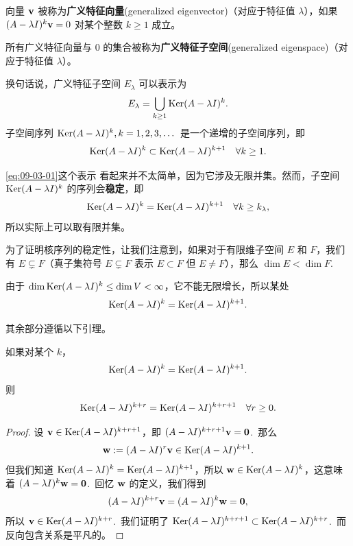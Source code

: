 \begin{definition}\label{stmt:09-03-02}
向量 $\mathbf{v}$ 被称为\textbf{广义特征向量}(generalized eigenvector)（对应于特征值 $\lambda$），如果 $(A - \lambda I)^k \mathbf{v} = 0$ 对某个整数 $k \geq 1$ 成立。
\end{definition}

所有广义特征向量与 $0$ 的集合被称为\textbf{广义特征子空间}(generalized eigenspace)（对应于特征值 $\lambda$）。

换句话说，广义特征子空间 $E_\lambda$ 可以表示为
\begin{equation}\label{eq:09-03-01}
E_\lambda = \bigcup_{k \geq 1} \operatorname{Ker}(A - \lambda I)^k.
\end{equation}
子空间序列 $\operatorname{Ker}(A - \lambda I)^k, k = 1, 2, 3, \dots$ 是一个递增的子空间序列，即
$$\operatorname{Ker}(A - \lambda I)^k \subset \operatorname{Ker}(A - \lambda I)^{k+1} \quad \forall k \geq 1.$$

\eqref{eq:09-03-01}这个表示  看起来并不太简单，因为它涉及无限并集。然而，子空间 $\operatorname{Ker}(A - \lambda I)^k$ 的序列会\textbf{稳定}，即
$$\operatorname{Ker}(A - \lambda I)^k = \operatorname{Ker}(A - \lambda I)^{k+1} \quad \forall k \geq k_\lambda,$$
所以实际上可以取有限并集。

为了证明核序列的稳定性，让我们注意到，如果对于有限维子空间 $E$ 和 $F$，我们有 $E \subsetneq F$（真子集符号 $E \subsetneq F$ 表示 $E \subset F$ 但 $E \neq F$），那么 $\dim E < \dim F$.~

由于 $\dim \operatorname{Ker}(A - \lambda I)^k \leq \dim V < \infty$，它不能无限增长，所以某处
$$\operatorname{Ker}(A - \lambda I)^k = \operatorname{Ker}(A - \lambda I)^{k+1}.$$

其余部分遵循以下引理。

\begin{lemma}\label{stmt:09-03-03}
如果对某个 $k$，
$$\operatorname{Ker}(A - \lambda I)^k = \operatorname{Ker}(A - \lambda I)^{k+1}.$$则
$$\operatorname{Ker}(A - \lambda I)^{k+r} = \operatorname{Ker}(A - \lambda I)^{k+r+1} \quad \forall r \geq 0.$$\end{lemma}

\begin{proof}设 $\mathbf{v} \in \operatorname{Ker}(A - \lambda I)^{k+r+1}$，即 $(A - \lambda I)^{k+r+1} \mathbf{v} = \mathbf{0}$.~那么 $$\mathbf{w} := (A - \lambda I)^r \mathbf{v} \in \operatorname{Ker}(A - \lambda I)^{k+1}.$$
但我们知道 $\operatorname{Ker}(A - \lambda I)^k = \operatorname{Ker}(A - \lambda I)^{k+1}$，所以 $\mathbf{w} \in \operatorname{Ker}(A - \lambda I)^k$，这意味着 $(A - \lambda I)^k \mathbf{w} = \mathbf{0}$.~回忆 $\mathbf{w}$ 的定义，我们得到
$$(A - \lambda I)^{k+r} \mathbf{v} = (A - \lambda I)^k \mathbf{w} = \mathbf{0},$$
所以 $\mathbf{v} \in \operatorname{Ker}(A - \lambda I)^{k+r}$.~我们证明了 $\operatorname{Ker}(A - \lambda I)^{k+r+1} \subset \operatorname{Ker}(A - \lambda I)^{k+r}$.~而反向包含关系是平凡的。\end{proof}

